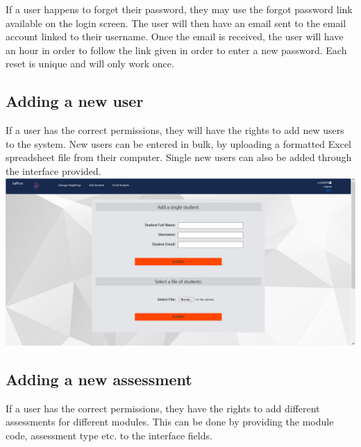 \documentclass[a4paper,12pt]{article}
\begin{document}
    	If a user happens to forget their password, they may use the forgot password link available on the login screen. The user will then have an email sent to the email account linked to their username. Once the email is received, the user will have an hour in order to follow the link given in order to enter a new password. Each reset is unique and will only work once.\\[1.0cm]
        
    	
    	\subsection{Adding a new user}
    	
        If a user has the correct permissions, they will have the rights to add new users to the system. New users can be entered in bulk, by uploading a formatted Excel spreadsheet file from their computer. Single new users can also be added through the interface provided.\\[1.0cm]
        
        \includegraphics[width=1\textwidth]{../images/screens/add-bulk-students.PNG}\\[1.0cm]  
        
    	\subsection{Adding a new assessment}
        
        If a user has the correct permissions, they have the rights to add different assessments for different modules. This can be done by providing the module code, assessment type etc. to the interface fields.\\[1.0cm]
        
\end{document}
